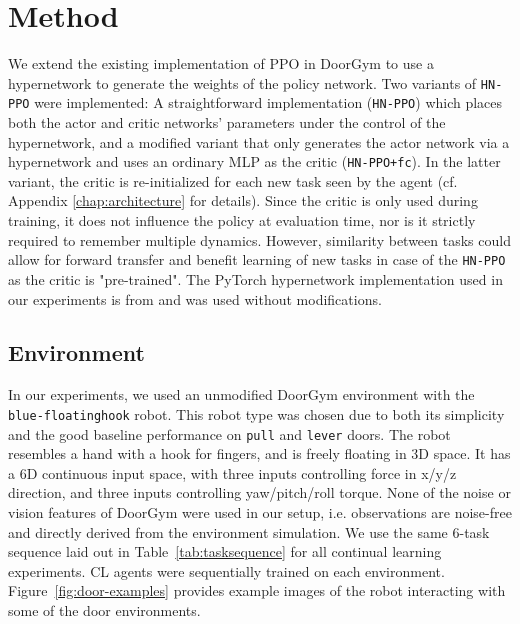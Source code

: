 \documentclass[dvipsnames]{article} %
\newcommand{\commentOLD}[1]{}
\newcommand{\saOLD}[1] {\commentOLD{{\color{cyan} SA: #1}}}                %
\newcommand{\asOLD}[1] {\commentOLD{{\color{orange} AS: #1}}}              %
\begin{document}
\section{Method}
We extend the existing implementation of PPO in DoorGym to use a hypernetwork to generate the weights of the policy network. Two variants of \texttt{HN-PPO} were implemented: A straightforward implementation (\texttt{HN-PPO}) which places both the actor and critic networks' parameters under the control of the hypernetwork, and a modified variant that only generates the actor network via a hypernetwork and uses an ordinary MLP as the critic (\texttt{HN-PPO+fc}). In the latter variant, the critic is re-initialized for each new task seen by the agent (cf. Appendix \ref{chap:architecture} for details). Since the critic is only used during training, it does not influence the policy at evaluation time, nor is it strictly required to remember multiple dynamics. However, similarity between tasks could allow for forward transfer and benefit learning of new tasks in case of the \texttt{HN-PPO} as the critic is "pre-trained".
The PyTorch hypernetwork implementation used in our experiments is from \cite{auddyHollensteinClfd} and was used without modifications. 

\subsection{Environment \asOLD{I think what you wrote about DoorGym should go here, otherwise it is way too many places.}}
\saOLD{Add a subsection for the RL environment and describe here the details of the RL setup and tasks, including any modifications that you made to the default door-gym and the reasons for such modifications. This needs to be connected to the content about door-gym in the background section. So, in the background, you can describe the default door-gym environment and in this section you can describe your specific tasks and modifications.}
In our experiments, we used an unmodified DoorGym \citep{doorgym} environment with the \texttt{blue-floatinghook} robot. This robot type was chosen due to both its simplicity and the good baseline performance on \texttt{pull} and \texttt{lever} doors. The robot resembles a hand with a hook for fingers, and is freely floating in 3D space. It has a 6D continuous input space, with three inputs controlling force in x/y/z direction, and three inputs controlling yaw/pitch/roll torque. None of the noise or vision features of DoorGym were used in our setup, i.e. observations are noise-free and directly derived from the environment simulation. We use the same 6-task sequence laid out in Table~\ref{tab:tasksequence} for all continual learning experiments. CL agents were sequentially trained on each environment. Figure~\ref{fig:door-examples} provides example images of the robot interacting with some of the door environments.
\saOLD{Some example images would be nice to have.}
\end{document}
